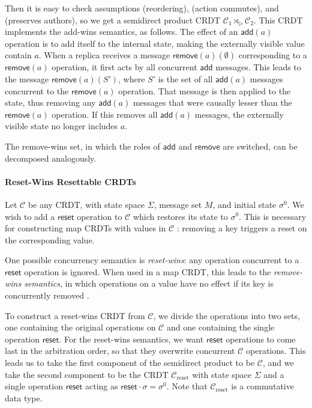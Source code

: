 \documentclass[acmsmall,nonacm]{acmart}
\newcommand{\mc}[1]{\ensuremath{\mathcal{#1}}}
\newcommand{\msf}[1]{\ensuremath{\mathsf{#1}}}
\newcommand{\act}{\triangleright}
\theoremstyle{plain}
\theoremstyle{definition}
\begin{document}
Then it is easy to check assumptions (reordering), (action commutes), and (preserves authors), so we get a semidirect product CRDT $\mc{C}_1 \rtimes_\act \mc{C}_2$.  This CRDT implements the add-wins semantics, as follows.  The effect of an $\msf{add}(a)$ operation is to add itself to the internal state, making the externally visible value contain $a$.  When a replica receives a message $\msf{remove}(a)(\emptyset)$ corresponding to a $\msf{remove}(a)$ operation, it first acts by all concurrent $\msf{add}$ messages.  This leads to the message $\msf{remove}(a)(S')$, where $S'$ is the set of all $\msf{add}(a)$ messages concurrent to the $\msf{remove}(a)$ operation.  That message is then applied to the state, thus removing any $\msf{add}(a)$ messages that were causally lesser than the $\msf{remove}(a)$ operation.  If this removes all $\msf{add}(a)$ messages, the externally visible state no longer includes $a$.

The remove-wins set, in which the roles of $\msf{add}$ and $\msf{remove}$ are switched, can be decomposed analogously.




\paragraph{Reset-Wins Resettable CRDTs}
Let $\mc{C}$ be any CRDT, with state space $\Sigma$, message set $M$, and initial state $\sigma^0$.  We wish to add a $\msf{reset}$ operation to $\mc{C}$ which restores its state to $\sigma^0$.  This is necessary for constructing map CRDTs with values in $\mc{C}$ \cite{riak_datatypes, antidote}: removing a key triggers a reset on the corresponding value.

One possible concurrency semantics is \textit{reset-wins}: any operation concurrent to a $\msf{reset}$ operation is ignored.  When used in a map CRDT, this leads to the \textit{remove-wins semantics}, in which operations on a value have no effect if its key is concurrently removed \cite[\S 2.1.5]{crdt_overview_preguica}.

To construct a reset-wins CRDT from $\mc{C}$, we divide the operations into two sets, one containing the original operations on $\mc{C}$ and one containing the single operation $\msf{reset}$.  For the reset-wins semantics, we want $\msf{reset}$ operations to come last in the arbitration order, so that they overwrite concurrent $\mc{C}$ operations.  This leads us to take the first component of the semidirect product to be $\mc{C}$, and we take the second component to be the CRDT $\mc{C}_{\text{reset}}$ with state space $\Sigma$ and a single operation $\msf{reset}$ acting as $\msf{reset} \cdot \sigma = \sigma^0$.  Note that $\mc{C}_{\text{reset}}$ is a commutative data type.
\end{document}
